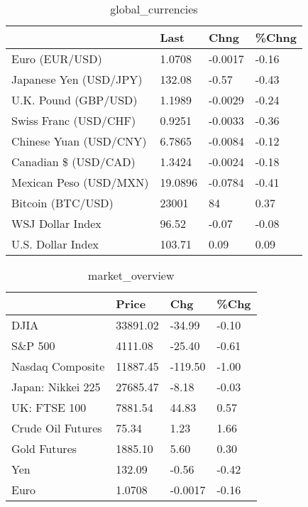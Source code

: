 \documentclass{article}%
\begin{document}
%


\begin{table}[htbp]%
\caption{global\_currencies}%
\centering%
\begin{adjustbox}{width=1\textwidth}%
\begin{tabular}{llll}
\toprule
                       &    Last &    Chng & \%Chng \\
\midrule
        Euro (EUR/USD) &  1.0708 & -0.0017 & -0.16 \\
Japanese Yen (USD/JPY) &  132.08 &   -0.57 & -0.43 \\
  U.K. Pound (GBP/USD) &  1.1989 & -0.0029 & -0.24 \\
 Swiss Franc (USD/CHF) &  0.9251 & -0.0033 & -0.36 \\
Chinese Yuan (USD/CNY) &  6.7865 & -0.0084 & -0.12 \\
  Canadian \$ (USD/CAD) &  1.3424 & -0.0024 & -0.18 \\
Mexican Peso (USD/MXN) & 19.0896 & -0.0784 & -0.41 \\
     Bitcoin (BTC/USD) &   23001 &      84 &  0.37 \\
      WSJ Dollar Index &   96.52 &   -0.07 & -0.08 \\
     U.S. Dollar Index &  103.71 &    0.09 &  0.09 \\
\bottomrule
\end{tabular}
%
\end{adjustbox}%
\end{table}

%


\begin{table}[htbp]%
\caption{market\_overview}%
\centering%
\begin{adjustbox}{width=1\textwidth}%
\begin{tabular}{llll}
\toprule
                  &    Price &     Chg &  \%Chg \\
\midrule
             DJIA & 33891.02 &  -34.99 & -0.10 \\
          S\&P 500 &  4111.08 &  -25.40 & -0.61 \\
 Nasdaq Composite & 11887.45 & -119.50 & -1.00 \\
Japan: Nikkei 225 & 27685.47 &   -8.18 & -0.03 \\
     UK: FTSE 100 &  7881.54 &   44.83 &  0.57 \\
Crude Oil Futures &    75.34 &    1.23 &  1.66 \\
     Gold Futures &  1885.10 &    5.60 &  0.30 \\
              Yen &   132.09 &   -0.56 & -0.42 \\
             Euro &   1.0708 & -0.0017 & -0.16 \\
\bottomrule
\end{tabular}
%
\end{adjustbox}%
\end{table}

%
\end{document}
